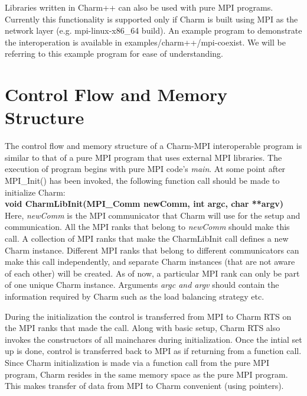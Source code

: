 Libraries written in Charm++ can also be used with pure MPI programs. Currently this
functionality is supported only if Charm is built using MPI as the network layer
(e.g. mpi-linux-x86\_64 build). An example program to demonstrate the
interoperation is available in examples/charm++/mpi-coexist. We will be
referring to this example program for ease of understanding.

\section{Control Flow and Memory Structure}
The control flow and memory structure of a Charm-MPI interoperable program  is
similar to that of a pure MPI program that uses external MPI libraries. The
execution of program begins with pure MPI code's {\em main}. At some point after 
MPI\_Init() has been invoked, the following function call should be made to initialize
Charm: \\

{\bf void CharmLibInit(MPI\_Comm newComm, int argc, char **argv)}\\

\noindent Here, {\em newComm} is the MPI communicator that Charm will use for
the setup and communication. All the MPI ranks that belong to {\em newComm} should 
make this call. A collection of MPI ranks that make the CharmLibInit call defines a 
new Charm instance. Different MPI ranks that belong to different communicators can 
make this call independently, and separate Charm instances (that are not aware of each other) 
will be created. As of now, a particular MPI rank can only be part of one unique Charm 
instance. Arguments {\em argc and argv} should contain the information required by Charm 
such as the load balancing strategy etc.

During the initialization the control is transferred from MPI to Charm
RTS on the MPI ranks that made the call. Along with basic setup, Charm RTS also invokes
the constructors of all mainchares during initialization. Once the intial set up
is done, control is transferred back to MPI as if returning from a function call. 
Since Charm initialization is made via a function call from the pure MPI
program, Charm resides in the same memory space as the pure MPI program. This
makes transfer of data from MPI to Charm convenient (using pointers).

